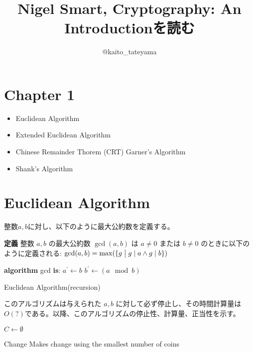 \documentclass{ujarticle}
\title{Nigel Smart, Cryptography: An Introductionを読む}
\author{@kaito\_tateyama}
\begin{document}
\maketitle

\section*{Chapter 1}
\begin{itemize}
    \item
      Euclidean Algorithm
    \item
      Extended Euclidean Algorithm
    \item
      Chinese Remainder Thorem (CRT) Garner's Algorithm
    \item
      Shank's Algorithm
\end{itemize}

\section*{Euclidean Algorithm}
整数\(a,b\)に対し、以下のように最大公約数を定義する。

\begin{screen}
  {\bf 定義} 整数 \(a,b\) の最大公約数 \(\gcd(a,b)\) は \(a \neq 0\) または \(b \neq 0\) のときに以下のように定義される:
  \( \gcd(a,b) = \max(\{g \bigm| g \mid a \land g \mid b \}) \)
\end{screen}

\begin{algorithm}
\DontPrintSemicolon %
  {\bf algorithm} gcd {\bf is}:\;
  $a^{\prime} \gets b$\;
  $b^{\prime} \gets (a \mod b)$\;
  \;
\caption{Euclidean Algorithm(recursion)}
\label{algo:max}
\end{algorithm}

このアルゴリズムは与えられた $a,b$ に対して必ず停止し、その時間計算量は $O(?)$である。以降、このアルゴリズムの停止性、計算量、正当性を示す。

\begin{algorithm}
\DontPrintSemicolon %
$C \gets \emptyset$\;
\;
\caption{{\sc Change} Makes change using the smallest number of coins}
\label{algo:change}
\end{algorithm}
\end{document}
